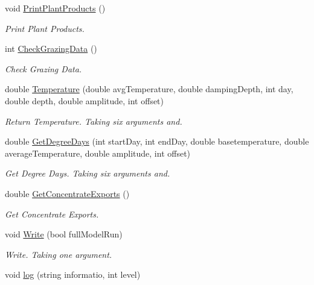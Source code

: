 \begin{DoxyCompactItemize}
\mbox{\label{class_global_vars_ad1d5b8cf02cda37a3323a94dff915e00}} 
void \mbox{\hyperlink{class_global_vars_ad1d5b8cf02cda37a3323a94dff915e00}{Print\+Plant\+Products}} ()
\begin{DoxyCompactList}\small\item\em Print Plant Products. \end{DoxyCompactList}\item 
int \mbox{\hyperlink{class_global_vars_ad893d360c7c5ac004598509b57351d90}{Check\+Grazing\+Data}} ()
\begin{DoxyCompactList}\small\item\em Check Grazing Data. \end{DoxyCompactList}\item 
double \mbox{\hyperlink{class_global_vars_a491bc8bab10f56f0c721d2b86c6e5a30}{Temperature}} (double avg\+Temperature, double damping\+Depth, int day, double depth, double amplitude, int offset)
\begin{DoxyCompactList}\small\item\em Return Temperature. Taking six arguments and. \end{DoxyCompactList}\item 
double \mbox{\hyperlink{class_global_vars_ab8f8dbf77cd4737e026fd884198851a3}{Get\+Degree\+Days}} (int start\+Day, int end\+Day, double basetemperature, double average\+Temperature, double amplitude, int offset)
\begin{DoxyCompactList}\small\item\em Get Degree Days. Taking six arguments and. \end{DoxyCompactList}\item 
double \mbox{\hyperlink{class_global_vars_a5dd795fb00a43c71cc25f921fde2dc06}{Get\+Concentrate\+Exports}} ()
\begin{DoxyCompactList}\small\item\em Get Concentrate Exports. \end{DoxyCompactList}\item 
void \mbox{\hyperlink{class_global_vars_af8ac71ca66dd50559a3ff31d6ef11e9a}{Write}} (bool full\+Model\+Run)
\begin{DoxyCompactList}\small\item\em Write. Taking one argument. \end{DoxyCompactList}\item 
void \mbox{\hyperlink{class_global_vars_a4b8a43181c226aed4b3334209f337ae2}{log}} (string informatio, int level)

\end{DoxyCompactItemize}
